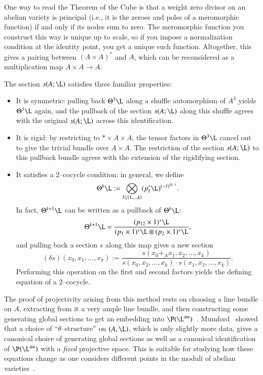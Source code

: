 \begin{remark}
One way to read the Theorem of the Cube is that a weight zero divisor on an abelian variety is principal (i.e., it is the zeroes and poles of a meromorphic function) if and only if its nodes sum to zero.  The meromorphic function you construct this way is unique up to scale, so if you impose a normalization condition at the identity point, you get a unique such function.  Altogether, this gives a pairing between $(A \times A)^*$ and $A$, which can be reconsidered as a multiplication map $A \times A \to A$.
\end{remark}

\begin{remark}
The section $s(A; \L)$ satisfies three familiar properties:
\begin{itemize}
\item It is symmetric: pulling back $\Theta^3 \L$ along a shuffle automorphism of $A^3$ yields $\Theta^3 \L$ again, and the pullback of the section $s(A; \L)$ along this shuffle agrees with the original $s(A; \L)$ across this identification.
\item It is rigid: by restricting to $* \times A \times A$, the tensor factors in $\Theta^3 \L$ cancel out to give the trivial bundle over $A \times A$.  The restriction of the section $s(A; \L)$ to this pullback bundle agrees with the extension of the rigidifying section.
\item It satisfies a $2$--cocycle condition: in general, we define \[\Theta^k \L := \bigotimes_{I \subseteq \{1, \ldots, k\}} (p_I^* \L)^{(-1)^{|I| - 1}}.\]  In fact, $\Theta^{k+1} \L$ can be written as a pullback of $\Theta^k \L$: \[\Theta^{k+1} \L = \frac{(p_{12} \times 1)^* \L}{(p_1 \times 1)^* \L \otimes (p_2 \times 1)^* \L},\] and pulling back a section $s$ along this map gives a new section \[(\delta s)(x_0, x_1, \ldots, x_k) := \frac{s(x_0 +_A x_1, x_2, \ldots, x_k)}{s(x_0, x_2, \ldots, x_k) \cdot s(x_1, x_2, \ldots, x_k)}.\]  Performing this operation on the first and second factors yields the defining equation of a $2$--cocycle.
\end{itemize}
\end{remark}

\begin{remark}
The proof of projectivity arising from this method rests on choosing a line bundle on $A$, extracting from it a very ample line bundle, and then constructing some generating global sections to get an embedding into $\P(\L^{\oplus n})$~\cite[Remark II.7.8.2]{Hartshorne}.  Mumford~\cite{MumfordEquationsI} showed that a choice of ``$\theta$--structure'' on $(A, \L)$, which is only slightly more data, gives a canonical choice of generating global sections as well as a canonical identification of $\P(\L^{\oplus n})$ with a \emph{fixed} projective space.  This is suitable for studying how these equations change as one considers different points in the moduli of abelian varieties~\cite{MumfordEquationsII,MumfordEquationsIII}.
\end{remark}

